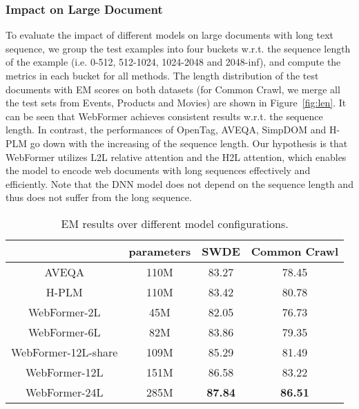 \documentclass[sigconf]{acmart}
\begin{document}
\subsubsection{Impact on Large Document}
To evaluate the impact of different models on large documents with long text sequence, we group the test examples into four buckets w.r.t. the sequence length of the example (i.e. 0-512, 512-1024, 1024-2048 and 2048-inf), and compute the metrics in each bucket for all methods. The length distribution of the test documents with EM scores on both datasets (for Common Crawl, we merge all the test sets from Events, Products and Movies) are shown in Figure~\ref{fig:len}. It can be seen that WebFormer achieves consistent results w.r.t. the sequence length. In contrast, the performances of OpenTag, AVEQA, SimpDOM and H-PLM go down with the increasing of the sequence length.
Our hypothesis is that WebFormer utilizes L2L relative attention and the H2L attention, which enables the model to encode web documents with long sequences effectively and efficiently. Note that the DNN model does not depend on the sequence length and thus does not suffer from the long sequence.
\begin{table}
\begin{adjustbox}{width=0.95\columnwidth,center}
\begin{tabular}{c|c|c|c}
\hline
 & parameters & SWDE  & Common Crawl \\
\hline
AVEQA & 110M & 83.27 & 78.45  \\
H-PLM & 110M & 83.42 & 80.78  \\
\hline
WebFormer-2L & 45M & 82.05 & 76.73 \\
WebFormer-6L & 82M & 83.86 & 79.35 \\
WebFormer-12L-share & 109M & 85.29 & 81.49 \\
WebFormer-12L & 151M & 86.58 & 83.22 \\
WebFormer-24L & 285M & {\bf 87.84} & {\bf 86.51} \\
\hline
\end{tabular}
\end{adjustbox}
\caption{EM results over different model configurations.}\label{ablation}
\end{table}
\end{document}
